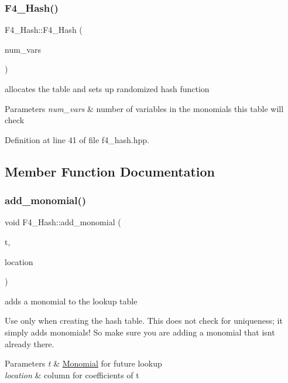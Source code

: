 \subsubsection{\texorpdfstring{F4\+\_\+\+Hash()}{F4\_Hash()}}
{\footnotesize\ttfamily F4\+\_\+\+Hash\+::\+F4\+\_\+\+Hash (\begin{DoxyParamCaption}\item[{N\+V\+A\+R\+\_\+\+T\+Y\+PE}]{num\+\_\+vars }\end{DoxyParamCaption})\hspace{0.3cm}{\ttfamily [inline]}}



allocates the table and sets up randomized hash function 


\begin{DoxyParams}{Parameters}
{\em num\+\_\+vars} & number of variables in the monomials this table will check \\
\hline
\end{DoxyParams}


Definition at line 41 of file f4\+\_\+hash.\+hpp.



\subsection{Member Function Documentation}
\mbox{\label{class_f4___hash_a86a18244162325e3d792ea39525b23f8}} 
\subsubsection{\texorpdfstring{add\+\_\+monomial()}{add\_monomial()}}
{\footnotesize\ttfamily void F4\+\_\+\+Hash\+::add\+\_\+monomial (\begin{DoxyParamCaption}\item[{const \hyperlink{group__polygroup_class_monomial}{Monomial} $\ast$}]{t,  }\item[{const size\+\_\+t}]{location }\end{DoxyParamCaption})\hspace{0.3cm}{\ttfamily [inline]}}



adds a monomial to the lookup table 

Use only when creating the hash table. This does not check for uniqueness; it simply adds monomials! So make sure you are adding a monomial that isn\textquotesingle{}t already there. 
\begin{DoxyParams}{Parameters}
{\em t} & {\ttfamily \hyperlink{group__polygroup_class_monomial}{Monomial}} for future lookup \\
\hline
{\em location} & column for coefficients of {\ttfamily t} \\
\hline
\end{DoxyParams}


